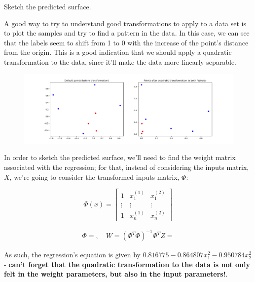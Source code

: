 \documentclass[12pt]{article}
\begin{document}
\begin{enumerate}[leftmargin=\labelsep]
{        Sketch the predicted surface.
        }

        A good way to try to understand good transformations to apply to a data set is
        to plot the samples and try to find a pattern in the data. In this case, we can
        see that the labels seem to shift from 1 to 0 with the increase of the point's
        distance from the origin. This is a good indication that we should apply a
        quadratic transformation to the data, since it'll make the data more linearly
        separable.

        \begin{figure}[H]
          \centering
          \includegraphics[width=\textwidth]{assets/ex-5/points.png}
        \end{figure}

        In order to sketch the predicted surface, we'll need to find the weight matrix
        associated with the regression; for that, instead of considering the inputs
        matrix, $X$, we're going to consider the transformed inputs matrix, $\Phi$:

        $$
          \Phi(x) = \begin{bmatrix}
            1      & x_1^{(1)} & x_1^{(2)} \\
            \vdots & \vdots    & \vdots    \\
            1      & x_n^{(1)} & x_n^{(2)}
          \end{bmatrix}
        $$

        \begin{align*}
          \Phi = , \quad
          W = (\Phi^T \Phi)^{-1} \Phi^T Z = 
        \end{align*}

        As such, the regression's equation is given by
        $0.816775 - 0.864807x_1^2 - 0.950784x_2^2$ - \textbf{can't forget that the quadratic
          transformation to the data is not only felt in the weight parameters, but also
          in the input parameters!}.


\end{enumerate}
\end{document}
